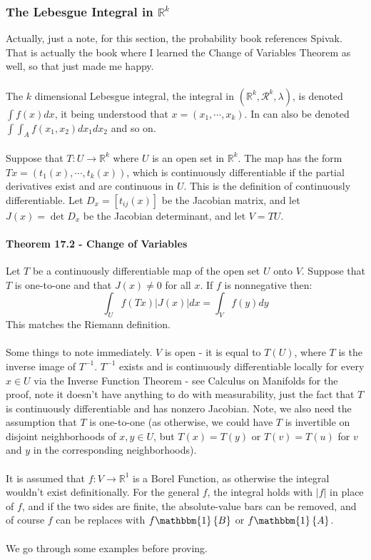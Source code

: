 \documentclass[12pt,a4paper]{article}
\newcommand{\1}[1]{\mathbbm{1}\left\{ #1 \right\}}
\newcommand{\R}{\mathbb{R}}
\newcommand{\rcal}{\mathcal{R}}
\begin{document}
\subsubsection{The Lebesgue Integral in $\R^k$} Actually, just a note, for this section, the probability book references Spivak. That is actually the book where I learned the Change of Variables Theorem as well, so that just made me happy.
\\\\
The $k$ dimensional Lebesgue integral, the integral in $(\R^k, \rcal^k, \lambda)$, is denoted $\int f(x) dx$, it being understood that $x = (x_1, \cdots, x_k)$. In can also be denoted $\int\int_A f(x_1,x_2) dx_1dx_2$ and so on.
\\\\
Suppose that $T: U \to \R^k$ where $U$ is an open set in $\R^k$. The map has the form $Tx = (t_1(x), \cdots, t_k(x))$, which is continuously differentiable if the partial derivatives exist and are continuous in $U$. This is the definition of continuously differentiable. Let $D_x = [t_{ij}(x)]$ be the Jacobian matrix, and let $J(x) = \det D_x$ be the Jacobian determinant, and let $V = TU$.

\paragraph{Theorem 17.2 - Change of Variables} Let $T$ be a continuously differentiable map of the open set $U$ onto $V$. Suppose that $T$ is one-to-one and that $J(x) \neq 0$ for all $x$. If $f$ is nonnegative then:
$$
	\int_U f(Tx) |J(x)| dx = \int_V f(y) dy
$$
This matches the Riemann definition.
\\\\
Some things to note immediately. $V$ is open - it is equal to $T(U)$, where $T$ is the inverse image of $T^{-1}$. $T^{-1}$ exists and is continuously differentiable locally for every $x \in U$ via the Inverse Function Theorem - see Calculus on Manifolds for the proof, note it doesn't have anything to do with measurability, just the fact that $T$ is continuously differentiable and has nonzero Jacobian. Note, we also need the assumption that $T$ is one-to-one (as otherwise, we could have $T$ is invertible on disjoint neighborhoods of $x,y \in U$, but $T(x) = T(y)$ or $T(v) = T(u)$ for $v$ and $y$ in the corresponding neighborhoods).
\\\\
It is assumed that $f: V \to \R^1$ is a Borel Function, as otherwise the integral wouldn't exist definitionally. For the general $f$, the integral holds with $|f|$ in place of $f$, and if the two sides are finite, the absolute-value bars can be removed, and of course $f$ can be replaces with $f\1{B}$ or $f\1{A}$.
\\\\
We go through some examples before proving.
\end{document}
